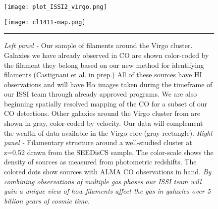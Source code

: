 \documentclass[11pt]{article}
\begin{document}
\begin{figure}[t!]
\vspace{-1cm}
\begin{minipage}{.5\textwidth}
  \centering
  \texttt{[image: plot\_ISSI2\_virgo.png]}
\end{minipage}%
\begin{minipage}{.5\textwidth}
  \centering
  \texttt{[image: cl1411-map.png]}
\end{minipage}
\vspace{-0.5cm}
\caption{\small{{\it Left panel - } Our sample of filaments around the Virgo cluster.  Galaxies we have already observed in CO are shown color-coded by the filament they belong based on our new method for identifying filaments (Castignani et al. in prep.)  All of these sources have HI observations and will have H$\alpha$ images taken during the timeframe of our ISSI team through already approved programs.  We are also beginning spatially resolved mapping of the CO for a subset of our CO detections.  Other galaxies around the Virgo cluster from \citet{Kim16} are shown in gray, color-coded by velocity.  Our data will complement the wealth of data available in the Virgo core (gray rectangle). {\it Right panel - } Filamentary structure around a well-studied cluster at z=0.52 drawn from the SEEDisCS sample.  The color-scale shows the density of sources as measured from photometric redshifts.  
The colored dots show sources with ALMA CO observations in hand.  \textit{By combining observations of multiple gas phases our ISSI team will gain a unique view of how filaments affect the gas in galaxies over 5 billion years of cosmic time.}}}
\label{fig:Fig1}
\vspace{0.2cm}
\hrule
\vspace{-0.5cm}
\end{figure}


\end{document}
